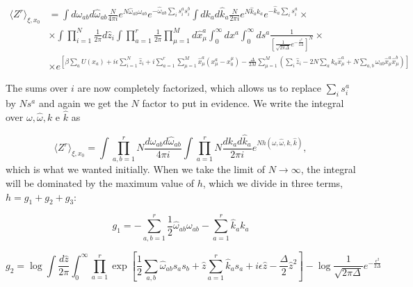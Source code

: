 \begin{align}
  \label{eq:a_33_new}
 \langle Z^r \rangle_{\xi, x_0} & =  \int d\omega_{ab}
  d\hat{\omega}_{ab} \frac{N}{4\pi i} e^{N \hat{\omega}_{ab}
    \omega_{ab}} e^{ - \hat{\omega}_{ab}\sum_i
      s_i^a s_i^b} \int dk_{a}
  d\hat{k}_{a} \frac{N}{2\pi i} e^{N \hat{k}_{a}
    k_{a}} e^{ - \hat{k}_{a}\sum_i
      s_i^a} \times \nonumber \\ 
    &\times \int \prod_{i=1}^N 
  \frac{1}{2\pi} d\hat{z}_i \int \prod_{a=1}^r
  \frac{1}{2\pi} \prod_{\mu=1}^M d\hat{x}_\mu^a \int_0^{\infty} d x^a
  \int_0^\infty ds^a \frac{1}{\left[\frac{1}{\sqrt{2\pi\Delta}}
      e^{-\frac{\epsilon^2}{2\Delta}}\right]^N}  \times \\ 
  & \times e^{\left[\beta \sum_a U(x_a) + i\epsilon\sum_{i=1}^N \hat{z}_i + i\sum_{a=1}^r \sum_{\mu=1}^M
    \hat{x}_\mu^a \left(x_\mu^a - x_0^\mu\right) -
    \frac{\Delta}{2M} \sum_{\mu=1}^M \left(\sum_i \hat{z}_i - 2N\sum_a
      k_a \hat{x}^a_\mu + N \sum_{a,b} \omega_{ab}\hat{x}_\mu^a
      \hat{x}_\mu^b\right)\right]} \nonumber
\end{align}

The sums over $i$ are now completely factorized, which allows us to replace $\sum_i s_i^a$ by $N s^a$ and again we get the $N$ factor to put in evidence. We write the integral over $\omega, \hat{\omega}, k$ e $\hat{k}$ as

\begin{equation}
  \label{eq:a_38}
  \langle Z^r \rangle_{\xi, x_0} = \int\prod_{a,b=1}^r N
  \frac{d\omega_{ab} d\hat{\omega}_{ab}}{4\pi i} \int \prod_{a=1}^r N
  \frac{dk_{a} d\hat{k}_{a}}{2\pi i} e^{N h(\omega, \hat{\omega}, k, \hat{k})},
\end{equation}
which is what we wanted initially. When we take the limit of $N\to\infty$, the integral will be dominated by the maximum value of $h$, which we divide in three terms, $h = g_1 + g_2 + g_3$:

\begin{equation}
  \label{eq:a_40}
  g_1 = -\sum_{a,b=1}^r  \frac{1}{2} \hat{\omega}_{ab} \omega_{ab} - \sum_{a=1}^r
  \hat{k}_a k_a 
\end{equation}

\begin{equation}
  \label{eq:a_41}
  g_2 = \log \int \frac{d\hat{z}}{2\pi} \int_0^\infty \prod_{a=1}^r
  \exp \left[ \frac{1}{2} \sum_{a,b} \hat{\omega}_{ab} s_a s_b +
    \hat{z} \sum_{a=1}^r \hat{k}_a s_a + i\epsilon \hat{z} -
    \frac{\Delta}{2} \hat{z}^2\right] - \log \frac{1}{\sqrt{2\pi\Delta}}
      e^{-\frac{\epsilon^2}{2\Delta}}
\end{equation}

